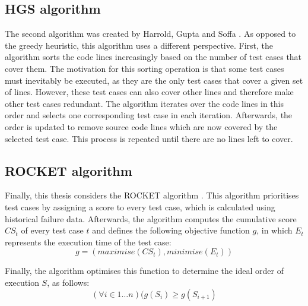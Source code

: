 \subsection{HGS algorithm}
\noindent The second algorithm was created by Harrold, Gupta and Soffa \cite{hgs}. As opposed to the greedy heuristic, this algorithm uses a different perspective. First, the algorithm sorts the code lines increasingly based on the number of test cases that cover them. The motivation for this sorting operation is that some test cases must inevitably be executed, as they are the only test cases that cover a given set of lines. However, these test cases can also cover other lines and therefore make other test cases redundant. The algorithm iterates over the code lines in this order and selects one corresponding test case in each iteration. Afterwards, the order is updated to remove source code lines which are now covered by the selected test case. This process is repeated until there are no lines left to cover.

\subsection{ROCKET algorithm}
\noindent Finally, this thesis considers the ROCKET algorithm \cite{6676952}. This algorithm prioritises test cases by assigning a score to every test case, which is calculated using historical failure data. Afterwards, the algorithm computes the cumulative score $CS_t$ of every test case $t$ and defines the following objective function $g$, in which $E_t$ represents the execution time of the test case:
$$g = (maximise(CS_t), minimise(E_t))$$

\noindent Finally, the algorithm optimises this function to determine the ideal order of execution $S$, as follows:
$$(\forall i \in 1 \dots n)(g(S_i) \ge g(S_{i+1})$$